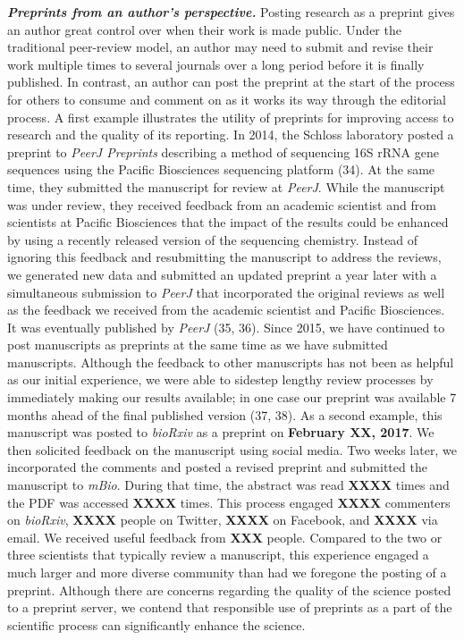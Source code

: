 \documentclass[11pt,]{article}
\begin{document}
\textbf{\emph{Preprints from an author's perspective.}} Posting research
as a preprint gives an author great control over when their work is made
public. Under the traditional peer-review model, an author may need to
submit and revise their work multiple times to several journals over a
long period before it is finally published. In contrast, an author can
post the preprint at the start of the process for others to consume and
comment on as it works its way through the editorial process. A first
example illustrates the utility of preprints for improving access to
research and the quality of its reporting. In 2014, the Schloss
laboratory posted a preprint to \emph{PeerJ Preprints} describing a
method of sequencing 16S rRNA gene sequences using the Pacific
Biosciences sequencing platform (34). At the same time, they submitted
the manuscript for review at \emph{PeerJ}. While the manuscript was
under review, they received feedback from an academic scientist and from
scientists at Pacific Biosciences that the impact of the results could
be enhanced by using a recently released version of the sequencing
chemistry. Instead of ignoring this feedback and resubmitting the
manuscript to address the reviews, we generated new data and submitted
an updated preprint a year later with a simultaneous submission to
\emph{PeerJ} that incorporated the original reviews as well as the
feedback we received from the academic scientist and Pacific
Biosciences. It was eventually published by \emph{PeerJ} (35, 36). Since
2015, we have continued to post manuscripts as preprints at the same
time as we have submitted manuscripts. Although the feedback to other
manuscripts has not been as helpful as our initial experience, we were
able to sidestep lengthy review processes by immediately making our
results available; in one case our preprint was available 7 months ahead
of the final published version (37, 38). As a second example, this
manuscript was posted to \emph{bioRxiv} as a preprint on
\textbf{February XX, 2017}. We then solicited feedback on the manuscript
using social media. Two weeks later, we incorporated the comments and
posted a revised preprint and submitted the manuscript to \emph{mBio}.
During that time, the abstract was read \textbf{XXXX} times and the PDF
was accessed \textbf{XXXX} times. This process engaged \textbf{XXXX}
commenters on \emph{bioRxiv}, \textbf{XXXX} people on Twitter,
\textbf{XXXX} on Facebook, and \textbf{XXXX} via email. We received
useful feedback from \textbf{XXX} people. Compared to the two or three
scientists that typically review a manuscript, this experience engaged a
much larger and more diverse community than had we foregone the posting
of a preprint. Although there are concerns regarding the quality of the
science posted to a preprint server, we contend that responsible use of
preprints as a part of the scientific process can significantly enhance
the science.
\end{document}
